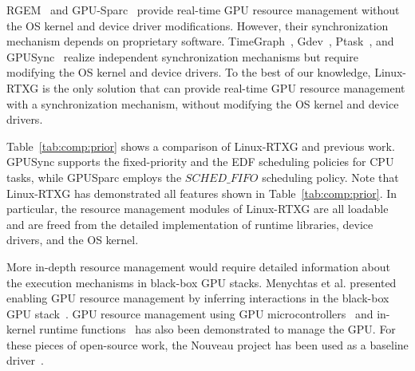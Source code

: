 \label{sec:relatedwork}
\begin{table*}[t]
\begin{center}
\caption{Linux-RTXG vs Prior Work}
\label{tab:comp:prior}
\ifthesis
{}
\fi
\end{center}
\vspace{-4mm}
\end{table*}

RGEM~\cite{kato:rgem} and GPU-Sparc~\cite{sparc} provide real-time GPU resource management without the OS kernel and device driver modifications.
However, their synchronization mechanism depends on proprietary software.
TimeGraph~\cite{kato:timegraph}, Gdev~\cite{kato:gdev}, Ptask~\cite{ptask}, and GPUSync~\cite{elliott:gpusync13} realize independent synchronization mechanisms but require modifying the OS kernel and device drivers.
To the best of our knowledge, Linux-RTXG is the only solution that can provide real-time GPU resource management with a synchronization mechanism, without modifying the OS kernel and device drivers.

Table~\ref{tab:comp:prior} shows a comparison of Linux-RTXG and previous work.
GPUSync supports the fixed-priority and the EDF scheduling policies for CPU tasks, while GPUSparc employs the $SCHED\_FIFO$ scheduling policy.
Note that Linux-RTXG has demonstrated all features shown in Table~\ref{tab:comp:prior}.
In particular, the resource management modules of Linux-RTXG are all loadable and are freed from the detailed implementation of runtime libraries, device drivers, and the OS kernel.

More in-depth resource management would require detailed information about the execution mechanisms in black-box GPU stacks.
Menychtas et al. presented enabling GPU resource management by inferring interactions in the black-box GPU stack~\cite{menychtas2013enabling}. 
GPU resource management using GPU microcontrollers~\cite{v	} and in-kernel runtime functions~\cite{kato:gdev} has also been demonstrated to manage the GPU.
For these pieces of open-source work, the Nouveau project has been used as a baseline driver~\cite{nouveau}.
